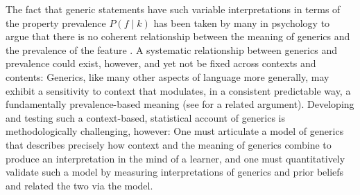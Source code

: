\documentclass[floatsintext,doc]{apa6}
\begin{document}


The fact that generic statements have such variable interpretations in terms of the property prevalence $P(f \mid k)$ has been taken by many in psychology to argue that there is no coherent relationship between the meaning of generics and the prevalence of the feature \cite{Leslie2008, Cimpian2010}. 
A systematic relationship between generics and prevalence could exist, however, and yet not be fixed across contexts and contents: Generics, like many other aspects of language more generally, may exhibit a sensitivity to context that modulates, in a consistent predictable way, a fundamentally prevalence-based meaning (see  for a related argument). 
Developing and testing such a context-based, statistical account of generics is methodologically challenging, however: One must articulate a model of generics that describes precisely how context and the meaning of generics combine to produce an interpretation in the mind of a learner, and one must  quantitatively validate such a model by measuring interpretations of generics and prior beliefs and related the two via the model.
\end{document}

